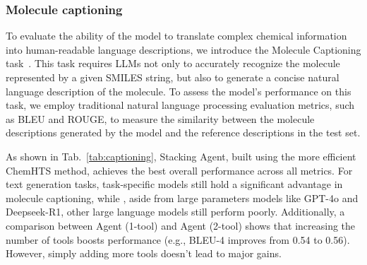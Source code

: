 \subsubsection{Molecule captioning}
To evaluate the ability of the model to translate complex chemical information into human-readable language descriptions, we introduce the Molecule Captioning task~\cite{guo2023largelanguagemodelschemistry}. This task requires LLMs not only to accurately recognize the molecule represented by a given SMILES string, but also to generate a concise natural language description of the molecule. 
To assess the model's performance on this task, we employ traditional natural language processing evaluation metrics, such as BLEU and ROUGE, to measure the similarity between the molecule descriptions generated by the model and the reference descriptions in the test set.

As shown in Tab.~\ref{tab:captioning}, Stacking Agent, built using the more efficient ChemHTS method, achieves the best overall performance across all metrics. For text generation tasks, task-specific models still hold a significant advantage in molecule captioning, while , aside from large parameters models like GPT-4o and Deepseek-R1, other large language models still perform poorly. Additionally, a comparison between Agent (1-tool) and Agent (2-tool) shows that increasing the number of tools boosts performance (e.g., BLEU-4 improves from 0.54 to 0.56). However, simply adding more tools doesn’t lead to major gains.

